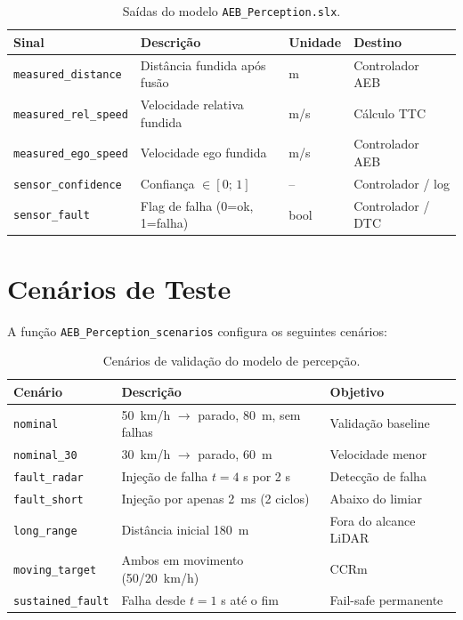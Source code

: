\documentclass[12pt,a4paper]{article}
\begin{document}
\begin{table}[H]
\centering
\caption{Sa\'idas do modelo \texttt{AEB\_Perception.slx}.}
\begin{tabularx}{\linewidth}{lXXX}
\toprule
\rowcolor{azulescuro}
\color{white}\textbf{Sinal} &
\color{white}\textbf{Descri\c{c}\~ao} &
\color{white}\textbf{Unidade} &
\color{white}\textbf{Destino} \\
\midrule
\rowcolor{azulclaro!40}
\texttt{measured\_distance}   & Dist\^ancia fundida ap\'os fus\~ao   & m    & Controlador AEB \\
\texttt{measured\_rel\_speed} & Velocidade relativa fundida           & m/s  & C\'alculo TTC \\
\rowcolor{azulclaro!40}
\texttt{measured\_ego\_speed} & Velocidade ego fundida                & m/s  & Controlador AEB \\
\texttt{sensor\_confidence}   & Confian\c{c}a $\in [0;\,1]$          & --   & Controlador / log \\
\rowcolor{azulclaro!40}
\texttt{sensor\_fault}        & Flag de falha (0=ok, 1=falha)         & bool & Controlador / DTC \\
\bottomrule
\end{tabularx}
\end{table}

\section{Cen\'arios de Teste}

A fun\c{c}\~ao \texttt{AEB\_Perception\_scenarios} configura os seguintes cen\'arios:

\begin{table}[H]
\centering
\caption{Cen\'arios de valida\c{c}\~ao do modelo de percep\c{c}\~ao.}
\begin{tabularx}{\linewidth}{lXX}
\toprule
\rowcolor{azulescuro}
\color{white}\textbf{Cen\'ario} &
\color{white}\textbf{Descri\c{c}\~ao} &
\color{white}\textbf{Objetivo} \\
\midrule
\rowcolor{azulclaro!40}
\texttt{nominal}          & 50~km/h $\to$ parado, 80~m, sem falhas  & Valida\c{c}\~ao baseline \\
\texttt{nominal\_30}      & 30~km/h $\to$ parado, 60~m              & Velocidade menor \\
\rowcolor{azulclaro!40}
\texttt{fault\_radar}     & Injeção de falha $t=4$ s por 2 s       & Detec\c{c}\~ao de falha \\
\texttt{fault\_short}     & Injeção por apenas 2~ms (2 ciclos)      & Abaixo do limiar \\
\rowcolor{azulclaro!40}
\texttt{long\_range}      & Dist\^ancia inicial 180~m               & Fora do alcance LiDAR \\
\texttt{moving\_target}   & Ambos em movimento (50/20~km/h)         & CCRm \\
\rowcolor{azulclaro!40}
\texttt{sustained\_fault} & Falha desde $t=1$ s at\'e o fim        & Fail-safe permanente \\
\bottomrule
\end{tabularx}
\end{table}
\end{document}
